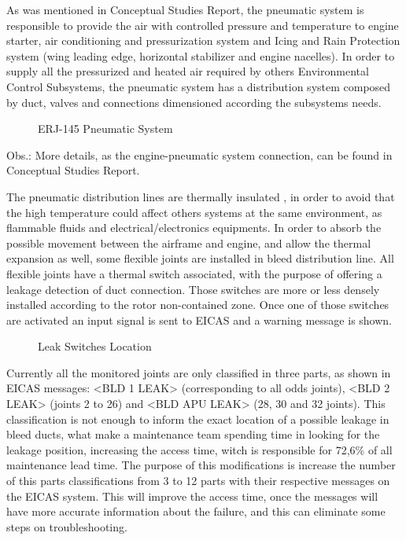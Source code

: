 As was mentioned in Conceptual Studies Report, the pneumatic system is responsible to provide the air with controlled pressure and temperature to engine starter, air conditioning and pressurization system and Icing and Rain Protection system (wing leading edge, horizontal stabilizer and engine nacelles). In order to supply all the pressurized and heated air required by others Environmental Control Subsystems, the pneumatic system has a distribution system composed by duct, valves and connections dimensioned according the subsystems needs.


\begin{figure}[H] %
\caption{ERJ-145 Pneumatic System}
\label{fig:PneumaticConection}
\end{figure}

Obs.: More details, as the engine-pneumatic system connection, can be found in Conceptual Studies Report.

The pneumatic distribution lines are thermally insulated , in order to avoid that the high temperature could affect others systems at the same environment, as flammable fluids and electrical/electronics equipments.
 In order to absorb the possible movement between the airframe and engine, and allow the thermal expansion as well, some flexible joints are installed in bleed distribution line. All flexible joints have a thermal switch associated, with the purpose of offering a leakage detection of duct connection. Those switches are more or less densely installed according to the rotor non-contained zone. Once one of those switches are activated an input signal is sent to EICAS and a warning message is shown.


\begin{figure}[H] %
\caption{Leak Switches Location}
\label{fig:leakswitcheslocation}
\end{figure}

Currently all the monitored joints are only classified in three parts, as shown in EICAS messages: <BLD 1 LEAK> (corresponding to all odds joints), <BLD 2 LEAK> (joints 2 to 26) and <BLD APU LEAK> (28, 30 and 32 joints). This classification is not enough to inform the exact location of a possible leakage in bleed ducts, what make a maintenance team spending time in looking for the leakage position, increasing the access time, witch is responsible for 72,6\% of all maintenance lead time.
The purpose of this modifications is increase the number of this parts classifications from 3 to 12 parts with their respective messages on the EICAS system. This will improve the access time, once the messages will have more accurate information about the failure, and this can eliminate some steps on troubleshooting.

